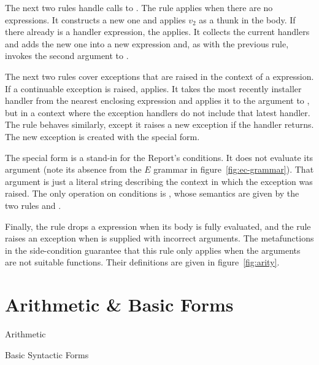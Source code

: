 The next two rules handle calls to .
The  rule applies when there are no 
expressions. It constructs a new one and applies $v_2$ as a
thunk in the  body. If there already is a handler
expression, the  applies. It collects the current
handlers and adds the new one into a new  expression
and, as with the previous rule, invokes the second argument to
.

The next two rules cover exceptions that are raised in the context of
a  expression. If a continuable exception is raised,
 applies. It takes the most recently installer
handler from the nearest enclosing  expression and
applies it to the argument to , but in a
context where the exception handlers do not include that latest
handler. The  rule behaves similarly, except it
raises a new exception if the handler returns. The new exception is
created with the  special form.

The  special form is a stand-in for the Report's
conditions. It does not evaluate its argument (note its absence from
the $E$ grammar in figure~\ref{fig:ec-grammar}). That argument
is just a literal string describing the context in which the exception
was raised. The only operation on conditions is ,
whose semantics are given by the two rules  and
.

Finally, the rule  drops a  expression
when its body is fully evaluated, and the rule 
raises an exception when  is supplied with
incorrect arguments.  The metafunctions in the side-condition
guarantee that this rule only applies when the arguments are not
suitable functions. Their definitions are given in
figure~\ref{fig:arity}.

\section{Arithmetic \& Basic Forms}

\beginfig
\begin{center}

\end{center}
\caption{Arithmetic}\label{fig:arithmetic}
\endfig

\beginfig
\begin{center}

\end{center}
\caption{Basic Syntactic Forms}\label{fig:basic-syntactic-forms}
\endfig

